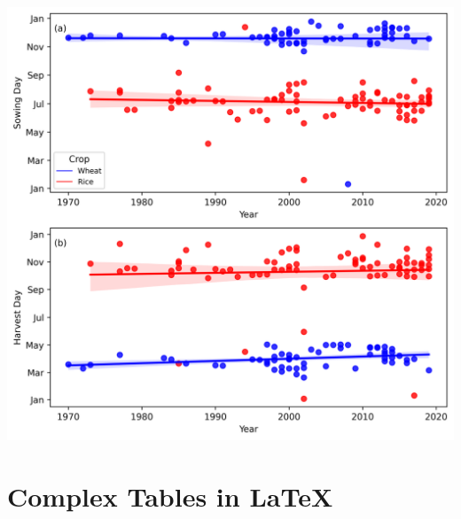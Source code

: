 \documentclass[11pt]{article}
\begin{document}
\begin{minipage}[c]{0.45\textwidth}
    \centering
    \captionsetup{width=.9\linewidth}
    \includegraphics[width=.95\textwidth]{Figures/Analysis_Observation_Sowing_Harvest_Dates_7Jan.png}
    \label{fig:analysis_sow_harv_dates}
\end{minipage}

\section{Complex Tables in LaTeX}
\end{document}
